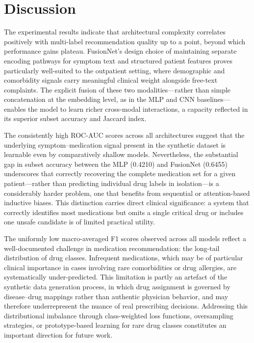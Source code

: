 \section{Discussion}

The experimental results indicate that architectural complexity correlates positively with multi-label recommendation quality up to a point, beyond which performance gains plateau. FusionNet's design choice of maintaining separate encoding pathways for symptom text and structured patient features proves particularly well-suited to the outpatient setting, where demographic and comorbidity signals carry meaningful clinical weight alongside free-text complaints. The explicit fusion of these two modalities---rather than simple concatenation at the embedding level, as in the MLP and CNN baselines---enables the model to learn richer cross-modal interactions, a capacity reflected in its superior subset accuracy and Jaccard index.

The consistently high ROC-AUC scores across all architectures suggest that the underlying symptom--medication signal present in the synthetic dataset is learnable even by comparatively shallow models. Nevertheless, the substantial gap in subset accuracy between the MLP (0.4210) and FusionNet (0.6455) underscores that correctly recovering the complete medication set for a given patient---rather than predicting individual drug labels in isolation---is a considerably harder problem, one that benefits from sequential or attention-based inductive biases. This distinction carries direct clinical significance: a system that correctly identifies most medications but omits a single critical drug or includes one unsafe candidate is of limited practical utility.

The uniformly low macro-averaged F1 scores observed across all models reflect a well-documented challenge in medication recommendation: the long-tail distribution of drug classes. Infrequent medications, which may be of particular clinical importance in cases involving rare comorbidities or drug allergies, are systematically under-predicted. This limitation is partly an artefact of the synthetic data generation process, in which drug assignment is governed by disease--drug mappings rather than authentic physician behavior, and may therefore underrepresent the nuance of real prescribing decisions. Addressing this distributional imbalance through class-weighted loss functions, oversampling strategies, or prototype-based learning for rare drug classes constitutes an important direction for future work.

